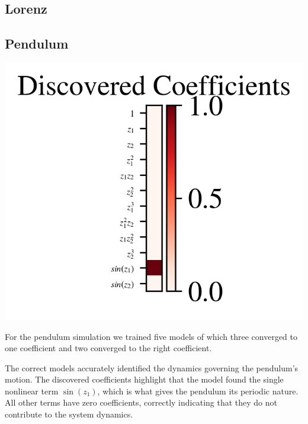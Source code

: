 \subsection{Lorenz}



\subsection{Pendulum}

\includegraphics[]{project_2/images/xi_pendulum_results.png}

For the pendulum simulation we trained five models of which three converged to one coefficient and two converged to the right coefficient.

The correct models accurately identified the dynamics governing the pendulum's motion. The discovered coefficients highlight that the model found the single nonlinear term $\sin (z_1)$, which is what gives the pendulum its periodic nature. All other terms have zero coefficients, correctly indicating that they do not contribute to the system dynamics.